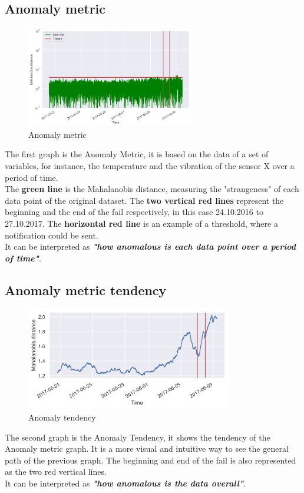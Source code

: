 \documentclass[11pt,twoside]{article}
\begin{document}
\subsection{Anomaly metric}
\begin{figure}[h!]
\centering
\includegraphics[width=0.65\textwidth]{0_AM_label.png}
\caption{Anomaly metric}\label{screenshots}
\end{figure}
\noindent The first graph is the Anomaly Metric, it is based on the data of a set of variables, for instance,
the temperature and the vibration of the sensor X over a period of time.\\
The \textbf{green line} is the Mahalanobis distance, measuring the "strangeness" of each data point
of the original dataset. The \textbf{two vertical red lines }represent the beginning and the end of the fail
respectively, in this case 24.10.2016 to 27.10.2017. The \textbf{horizontal red line} is an example of a
threshold, where a notification could be sent.\\
It can be interpreted as \textbf{\textit{"how anomalous is each data point over a period of time"}}.

\subsection{Anomaly metric tendency}
\begin{figure}[h!]
\centering
\includegraphics[width=0.8\textwidth]{0_T_label.png}
\caption{Anomaly tendency}\label{screenshots}
\end{figure}
\noindent The second graph is the Anomaly Tendency, it shows the tendency of the Anomaly metric graph.
It is a more visual and intuitive way to see the general path of the previous graph. The beginning and
end of the fail is also represented as the two red vertical lines.\\
It can be interpreted as \textbf{\textit{"how anomalous is the data overall"}}.
\end{document}
